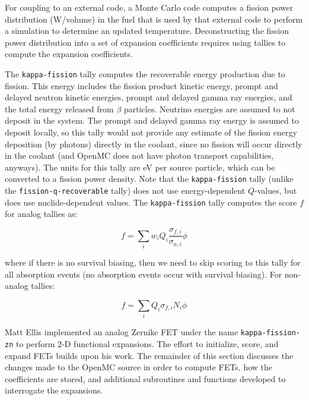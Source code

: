 \documentclass[10pt]{article}
\newcommand{\beq}{\begin{equation}}
\newcommand{\eeq}{\end{equation}}
\numberwithin{equation}{section} %
\begin{document}
For coupling to an external code, a Monte Carlo code computes a fission power distribution (W/volume) in the fuel that is used by that external code to perform a simulation to determine an updated temperature. Deconstructing the fission power distribution into a set of expansion coefficients requires using tallies to compute the expansion coefficients. 

The {\tt kappa-fission} tally computes the recoverable energy production due to fission. This energy includes the fission product kinetic energy, prompt and delayed neutron kinetic energies, prompt and delayed gamma ray energies, and the total energy released from \(\beta\) particles. Neutrino energies are assumed to not deposit in the system. The prompt and delayed gamma ray energy is assumed to deposit locally, so this tally would not provide any estimate of the fission energy deposition (by photons) directly in the coolant, since no fission will occur directly in the coolant (and OpenMC does not have photon transport capabilities, anyways). The units for this tally are eV per source particle, which can be converted to a fission power density. Note that the {\tt kappa-fission} tally (unlike the {\tt fission-q-recoverable} tally) does not use energy-dependent \(Q\)-values, but does use nuclide-dependent values. The {\tt kappa-fission} tally computes the score \(f\) for analog tallies as:

\beq
f=\sum_{i}w_iQ_i\frac{\sigma_{f,i}}{\sigma_{a,i}}\phi
\eeq

where if there is no survival biasing, then we need to skip scoring to this tally for all absorption events (no absorption events occur with survival biasing). For non-analog tallies:

\beq
f=\sum_{i}Q_i\sigma_{f,i}N_i\phi
\eeq

Matt Ellis implemented an analog Zernike FET under the name {\tt kappa-fission-zn} to perform 2-D functional expansions. The effort to initialize, score, and expand FETs builds upon his work. The remainder of this section discusses the changes made to the OpenMC source in order to compute FETs, how the coefficients are stored, and additional subroutines and functions developed to interrogate the expansions.

\end{document}
